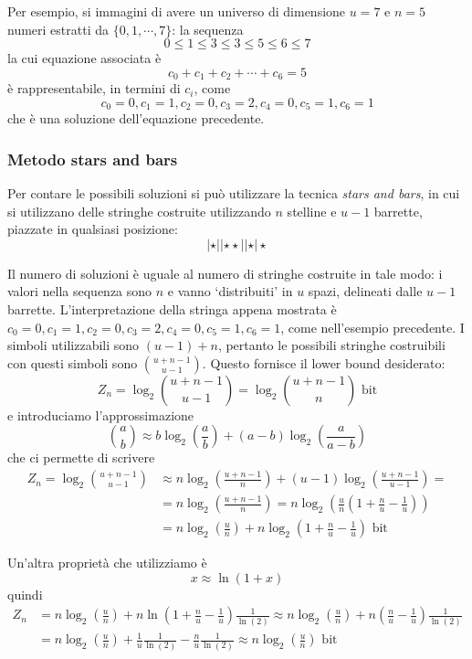 Per esempio, si immagini di avere un universo di dimensione $u = 7$ e $n = 5$ numeri 
estratti da $\{0, 1, \cdots, 7\}$: la sequenza 
$$
0 \leq 1 \leq 3 \leq 3 \leq 5 \leq 6 \le 7 
$$
la cui equazione associata è 
$$
c_0 + c_1 + c_2 + \cdots + c_6 = 5
$$
è rappresentabile, in termini di $c_i$, come 
$$
c_0 = 0, c_1 = 1, c_2 = 0, c_3 = 2, c_4 = 0, c_5 = 1, c_6 = 1
$$
che è una soluzione dell'equazione precedente. 

\subsubsection{Metodo stars and bars}
Per contare le possibili soluzioni si può utilizzare la tecnica \textit{stars and bars}, in 
cui si utilizzano delle stringhe costruite utilizzando $n$ stelline e $u-1$ barrette, piazzate 
in qualsiasi posizione: 
$$
| \star || \star \star || \star | \star
$$

Il numero di soluzioni è uguale al numero di stringhe costruite in tale modo: i valori nella sequenza 
sono $n$ e vanno `distribuiti' in $u$ spazi, delineati dalle $u-1$ barrette. L'interpretazione della 
stringa appena mostrata è $ c_0 = 0, c_1 = 1, c_2 = 0, c_3 = 2, c_4 = 0, c_5 = 1, c_6 = 1 $, come 
nell'esempio precedente. I simboli utilizzabili sono $(u-1) + n$, pertanto le possibili stringhe 
costruibili con questi simboli sono  ${u + n -1}\choose{u - 1}$.
Questo fornisce il lower bound desiderato:
$$
Z_n = \log_2{{u + n -1}\choose{u - 1}} = \log_2{{u + n - 1}\choose{n}} \text{ bit}
$$
e introduciamo l'approssimazione
$$
 {{a}\choose{b}} \approx b \log_2(\frac{a}{b}) + (a - b)\log_2(\frac{a}{a-b})
$$
che ci permette di scrivere
\begin{align*}
    Z_n = \log_2{{u + n -1}\choose{u - 1}} &\approx n \log_2(\frac{u + n -1}{n}) + (u -1) \log_2(\frac{u + n - 1}{u - 1}) = \\
					     &= n \log_2(\frac{u + n - 1}{n}) = n \log_2(\frac{u}{n}(1 + \frac{n}{u} - \frac{1}{u})) \\
					     &= n \log_2(\frac{u}{n}) + n \log_2(1 + \frac{n}{u} - \frac{1}{u}) \text{ bit}
\end{align*}

\noindent
Un'altra proprietà che utilizziamo è 
$$
x \approx \ln(1 + x)
$$
quindi 
\begin{align*}
    Z_n &= n \log_2(\frac{u}{n}) + n \ln(1 + \frac{n}{u}-\frac{1}{u})\frac{1}{\ln(2)} 
    \approx n \log_2(\frac{u}{n}) + n (\frac{n}{u}-\frac{1}{u})\frac{1}{\ln(2)} \\
	&= n \log_2(\frac{u}{n}) + \frac{1}{u}\frac{1}{\ln(2)} - \frac{n}{u}\frac{1}{\ln(2)} 
	\approx n \log_2(\frac{u}{n}) \text{ bit}
\end{align*}

